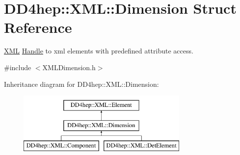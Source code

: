 \hypertarget{struct_d_d4hep_1_1_x_m_l_1_1_dimension}{}\section{D\+D4hep\+:\+:X\+ML\+:\+:Dimension Struct Reference}
\label{struct_d_d4hep_1_1_x_m_l_1_1_dimension}


\hyperlink{namespace_d_d4hep_1_1_x_m_l}{X\+ML} \hyperlink{class_d_d4hep_1_1_handle}{Handle} to xml elements with predefined attribute access.  




{\ttfamily \#include $<$X\+M\+L\+Dimension.\+h$>$}

Inheritance diagram for D\+D4hep\+:\+:X\+ML\+:\+:Dimension\+:\begin{figure}[H]
\begin{center}
\leavevmode
\includegraphics[height=3.000000cm]{struct_d_d4hep_1_1_x_m_l_1_1_dimension}
\end{center}
\end{figure}
